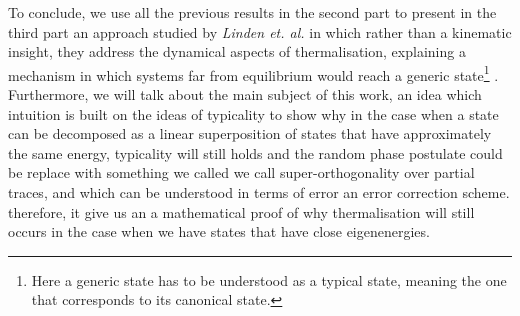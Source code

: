 \newline
To conclude, we use all the previous results in the second part to present in the third part an approach studied by \textit{Linden et. al.} \cite{linden_quantum_2009} in which rather than a kinematic insight, they address the dynamical aspects of thermalisation, explaining a mechanism in which systems far from equilibrium would reach a generic state\footnote{Here a generic state has to be understood as a typical state, meaning the one that corresponds to its canonical state.} \cite{linden_quantum_2009}. Furthermore, we will talk about the main subject of this work, an idea which intuition is built on the ideas of typicality to show why in the case when a state can be decomposed as a linear superposition of states that have approximately the same energy, typicality will still holds and the random phase postulate could be replace with something we called we call super-orthogonality over partial traces, and which can be understood in terms of error an error correction scheme. therefore, it give us an a mathematical proof of why thermalisation will still occurs in the case when we have states that have close eigenenergies.


